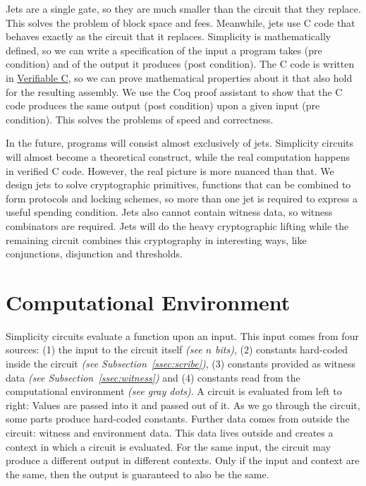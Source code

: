 Jets are a single gate,
so they are much smaller than the circuit that they replace.
This solves the problem of block space and fees.
%
Meanwhile,
jets use C code that behaves exactly as the circuit that it replaces.
Simplicity is mathematically defined,
so we can write a specification of the input a program takes (pre condition)
and of the output it produces (post condition).
The C code is written in \href{https://vst.cs.princeton.edu/}{Verifiable C},
so we can prove mathematical properties about it that also hold for the resulting assembly.
We use the Coq proof assistant to show that the C code produces the same output (post condition) upon a given input (pre condition).
This solves the problems of speed and correctness.

In the future,
programs will consist almost exclusively of jets.
Simplicity circuits will almost become a theoretical construct,
while the real computation happens in verified C code.
However,
the real picture is more nuanced than that.
We design jets to solve cryptographic primitives,
functions that can be combined to form protocols and locking schemes,
so more than one jet is required to express a useful spending condition.
Jets also cannot contain witness data,
so witness combinators are required.
Jets will do the heavy cryptographic lifting while the remaining circuit combines this cryptography in interesting ways,
like conjunctions, disjunction and thresholds.

\section{Computational Environment}%
\label{sec:environment}


%
Simplicity circuits evaluate a function upon an input.
This input comes from four sources:
(1) the input to the circuit itself \emph{(see $n$ bits)},
(2) constants hard-coded inside the circuit \emph{(see Subsection~\ref{ssec:scribe})},
(3) constants provided as witness data \emph{(see Subsection~\ref{ssec:witness})} and
(4) constants read from the computational environment \emph{(see gray dots)}.
%
A circuit is evaluated from left to right:
Values are passed into it and passed out of it.
As we go through the circuit,
some parts produce hard-coded constants.
Further data comes from outside the circuit: witness and environment data.
This data lives outside and creates a context in which a circuit is evaluated.
For the same input,
the circuit may produce a different output in different contexts.
Only if the input and context are the same,
then the output is guaranteed to also be the same.

